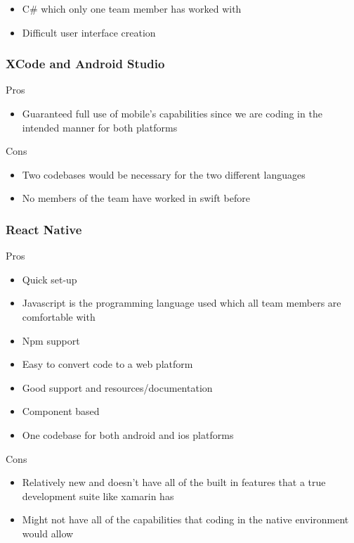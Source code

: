 \documentclass[onecolumn, draftclsnofoot,10pt, compsoc]{IEEEtran}
\begin{document}
\begin{itemize}
    \item C\# which only one team member has worked with
    \item Difficult user interface creation
\end{itemize}
\subsubsection{XCode and Android Studio}

Pros

\begin{itemize}
    \item Guaranteed full use of mobile's capabilities since we are coding in the intended manner for both platforms
\end{itemize}

Cons

\begin{itemize}
    \item Two codebases would be necessary for the two different languages
    \item No members of the team have worked in swift before
\end{itemize}

\subsubsection{React Native}

Pros

\begin{itemize}
    \item Quick set-up
    \item Javascript is the programming language used which all team members are comfortable with
    \item Npm support
    \item Easy to convert code to a web platform
    \item Good support and resources/documentation
    \item Component based
    \item One codebase for both android and ios platforms
\end{itemize}

Cons

\begin{itemize}
    \item Relatively new and doesn't have all of the built in features that a true development suite like xamarin has
    \item Might not have all of the capabilities that coding in the native environment would allow
\end{itemize}
\end{document}
